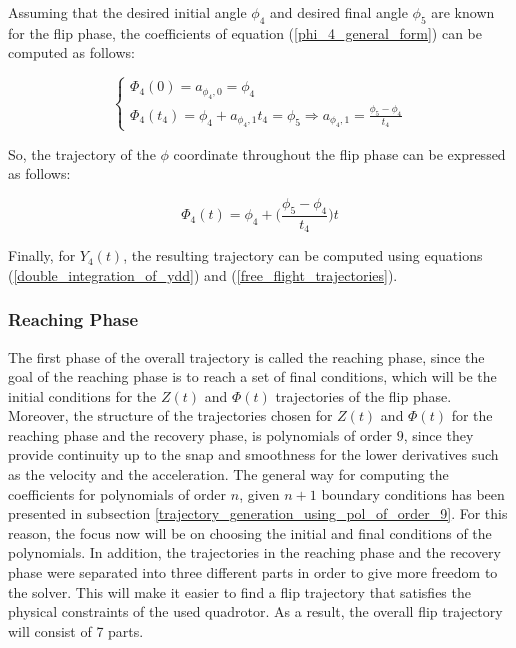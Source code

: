 \documentclass{thesisreport}
\begin{document}
\begin{itemize}
Assuming that the desired initial angle $\phi_4$ and desired final angle $\phi_5$ are known for the flip phase, the coefficients of equation (\ref{phi_4_general_form}) can be computed as follows:

\begin{equation}
	\begin{cases}
		\Phi_4 (0) = a_{\phi_4,0}=\phi_4 \\
		\Phi_4 (t_4) = \phi_4 + a_{\phi_4,1} t_4 = \phi_5 \Rightarrow a_{\phi_4,1}=\frac{\phi_5 - \phi_4}{t_4}
	\end{cases}
\end{equation}

So, the trajectory of the $\phi$ coordinate throughout the flip phase can be expressed as follows:

\begin{equation}
	\Phi_4 (t) = \phi_4 + \bigg( \frac{\phi_5 - \phi_4}{t_4} \bigg) t
\end{equation}

Finally, for $Y_4(t)$, the resulting trajectory can be computed using equations (\ref{double_integration_of_ydd})
 and (\ref{free_flight_trajectories}).

\end{itemize}


\subsubsection*{Reaching Phase}

The first phase of the overall trajectory is called the reaching phase, since the goal of the reaching phase is to reach a set of final conditions, which will be the initial conditions for the $Z(t)$ and $\Phi (t)$ trajectories of the flip phase. Moreover, the structure of the trajectories chosen for $Z(t)$ and $\Phi(t)$ for the reaching phase and the recovery phase, is polynomials of order $9$, since they provide continuity up to the snap and smoothness for the lower derivatives such as the velocity and the acceleration. The general way for computing the coefficients for polynomials of order $n$, given $n+1$ boundary conditions has been presented in subsection \ref{trajectory_generation_using_pol_of_order_9}. For this reason, the focus now will be on choosing the initial and final conditions of the polynomials. In addition, the trajectories in the reaching phase and the recovery phase were separated into three different parts in order to give more freedom to the solver. This will make it easier to find a flip trajectory that satisfies the physical constraints of the used quadrotor. As a result, the overall flip trajectory will consist of 7 parts.
\end{document}
